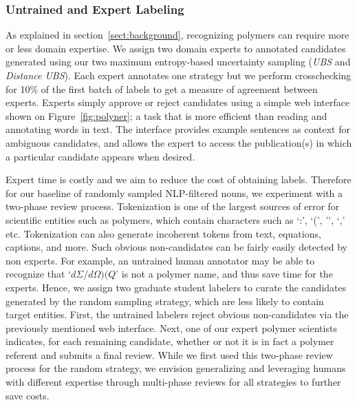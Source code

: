 \subsubsection{Untrained and Expert Labeling}
As explained in section~\ref{sect:background}, recognizing polymers can require more or less domain expertise.
We assign two domain experts to annotated candidates generated using our two maximum entropy-based uncertainty sampling (\textit{UBS} and \textit{Distance UBS}). 
Each expert annotates one strategy but we perform crosschecking for 10\% of the first batch of labels to get a measure of agreement between experts. 
Experts simply approve or reject candidates using a simple web interface shown on Figure~\ref{fig:polyner}; a task that is more efficient than reading and annotating words in text.
The interface
provides example sentences as context for ambiguous candidates,
and allows the expert to access the publication(s) in which a particular candidate
appears when desired.

Expert time is costly and we aim to reduce the cost of obtaining labels.
Therefore for our baseline of randomly sampled NLP-filtered nouns, we experiment with a two-phase review process.
Tokenization is one of the largest sources of error for scientific entities such as polymers, 
which contain characters such as `:', `(',
'\textendash', `,' etc. 
Tokenization can also generate incoherent tokens from text, equations, captions, and more.
Such obvious non-candidates can be fairly easily detected by non experts.
For example, an untrained human annotator may be able to recognize that `$d\Sigma/d\Omega)(Q$' is not a polymer name, and thus save time for the experts.
Hence, we assign two graduate student labelers to curate the candidates generated by the random sampling strategy, which are less likely to contain target entities.
First, the untrained labelers reject obvious non-candidates via the previously mentioned web interface. 
Next, one of our expert polymer scientists indicates, for each remaining
candidate, whether or not it is in fact a polymer referent and submits a final review.
While we first used this two-phase review process for the random strategy, 
we envision generalizing and leveraging humans with different expertise through multi-phase reviews for all strategies to further save costs.


